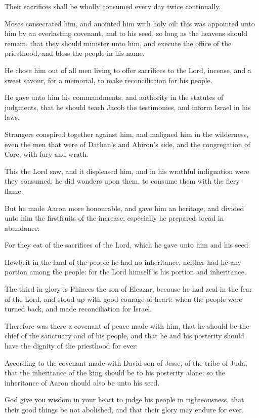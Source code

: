 {\par }{\PP {}Their sacrifices shall be wholly consumed every day twice continually.
\par }{\PP {}Moses consecrated him, and anointed him with holy oil: this was appointed unto him by an everlasting covenant, and to his seed, so long as the heavens should remain, that they should minister unto him, and execute the office of the priesthood, and bless the people in his name.
\par }{\PP {}He chose him out of all men living to offer sacrifices to the Lord, incense, and a sweet savour, for a memorial, to make reconciliation for his people.
\par }{\PP {}He gave unto him his commandments, and authority in the statutes of judgments, that he should teach Jacob the testimonies, and inform Israel in his laws.
\par }{\PP {}Strangers conspired together against him, and maligned him in the wilderness, even the men that were of Dathan’s and Abiron’s side, and the congregation of Core, with fury and wrath.
\par }{\PP {}This the Lord saw, and it displeased him, and in his wrathful indignation were they consumed: he did wonders upon them, to consume them with the fiery flame.
\par }{\PP {}But he made Aaron more honourable, and gave him an heritage, and divided unto him the firstfruits of the increase; especially he prepared bread in abundance:
\par }{\PP {}For they eat of the sacrifices of the Lord, which he gave unto him and his seed.
\par }{\PP {}Howbeit in the land of the people he had no inheritance, neither had he any portion among the people: for the Lord himself is his portion and inheritance.
\par }{\PP {}The third in glory is Phinees the son of Eleazar, because he had zeal in the fear of the Lord, and stood up with good courage of heart: when the people were turned back, and made reconciliation for Israel.
\par }{\PP {}Therefore was there a covenant of peace made with him, that he should be the chief of the sanctuary and of his people, and that he and his posterity should have the dignity of the priesthood for ever:
\par }{\PP {}According to the covenant made with David son of Jesse, of the tribe of Juda, that the inheritance of the king should be to his posterity alone: so the inheritance of Aaron should also be unto his seed.
\par }{\PP {}God give you wisdom in your heart to judge his people in righteousness, that their good things be not abolished, and that their glory may endure for ever.

}
